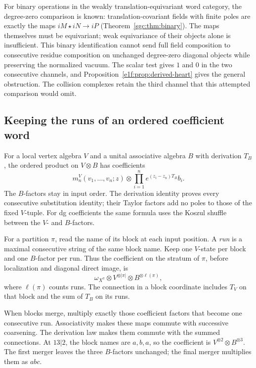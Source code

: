 For binary operations in the weakly translation-equivariant
word category, the degree-zero comparison is known:
translation-covariant fields with finite poles are exactly
the maps \(iM\star iN\to iP\)
(Theorem~\ref{sgc:thm:binary}). The maps themselves must be
equivariant; weak equivariance of their objects alone is
insufficient. This binary identification cannot send full
field composition to consecutive residue composition on
unchanged degree-zero diagonal objects while preserving
the normalized vacuum. The scalar test gives \(1\) and
\(0\) in the two consecutive channels, and
Proposition~\ref{e1f:prop:derived-heart} gives the general
obstruction. The collision complexes retain the third
channel that this attempted comparison would omit.

\subsection{Keeping the runs of an ordered coefficient word}

For a local vertex algebra \(V\) and a unital associative
algebra \(B\) with derivation \(T_B\), the ordered product
on \(V\otimes B\) has coefficients
\[
 m_n^V(v_1,\ldots,v_n;z)\otimes
                  \prod_{i=1}^n e^{(z_i-z_n)T_B}b_i.
\]
The \(B\)-factors stay in input order. The derivation
identity proves every consecutive substitution identity;
their Taylor factors add no poles to those of the fixed
\(V\)-tuple. For dg coefficients the same formula uses
the Koszul shuffle between the \(V\)- and \(B\)-factors.

For a partition \(\pi\), read the name of its block at
each input position. A \emph{run} is a maximal consecutive
string of the same block name. Keep one \(V\)-state per
block and one \(B\)-factor per run. Thus the coefficient
on the stratum of \(\pi\), before localization and
diagonal direct image, is
\[
 \omega_{X^\pi}\otimes V^{\otimes|\pi|}
                           \otimes B^{\otimes\ell(\pi)},
\]
where \(\ell(\pi)\) counts runs. The connection in a
block coordinate includes \(T_V\) on that block and the
sum of \(T_B\) on its runs.

When blocks merge, multiply exactly those coefficient
factors that become one consecutive run. Associativity
makes these maps commute with successive coarsening.
The derivation law makes them commute with the summed
connections. At \(13|2\), the block names are \(a,b,a\),
so the coefficient is \(V^{\otimes2}\otimes B^{\otimes3}\).
The first merger leaves the three \(B\)-factors unchanged;
the final merger multiplies them as \(abc\).

